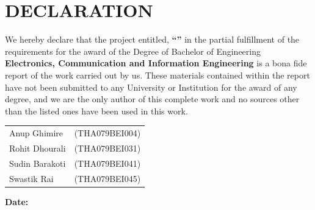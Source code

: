 \chapter*{DECLARATION}
{} %

\noindent We hereby declare that the project entitled, \textbf{``\cTitle''} in the partial fulfillment  of the requirements for the award of the Degree of Bachelor of Engineering \textbf{Electronics, Communication and Information Engineering} is a bona fide report of the work carried out by us. These materials contained within the report have not been submitted to any University or Institution for the award of any degree, and we are the only author of this complete work and no sources other than the listed ones have been used in this work.
\vspace{0.5cm}

\noindent 
\begin{tabular}{@{} ll}
Anup Ghimire	&(THA079BEI004)\\
Rohit Dhourali	&(THA079BEI031)\\
Sudin Barakoti	&(THA079BEI041)\\
Swastik Rai	&(THA079BEI045)
\end{tabular}

\textbf{Date:} \cDate

